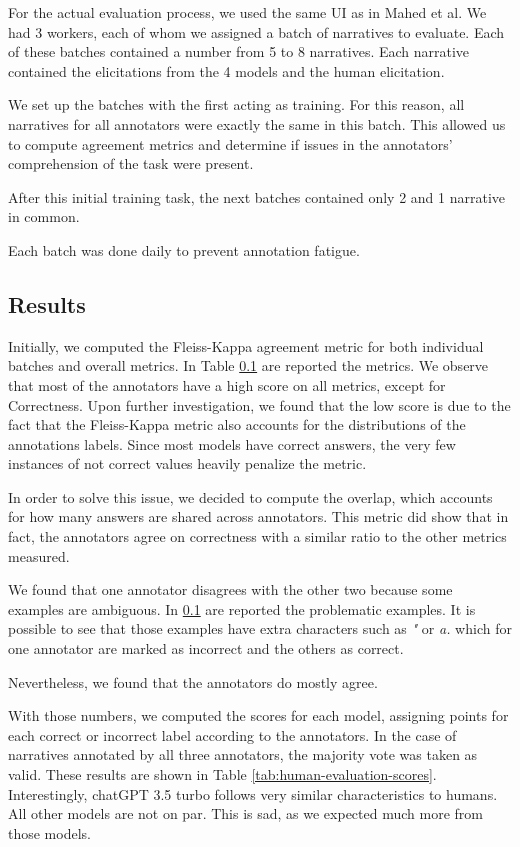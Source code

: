 For the actual evaluation process, we used the same UI as in Mahed et al. 
We had 3 workers, each of whom we assigned a batch of narratives to evaluate. 
Each of these batches contained a number from 5 to 8 narratives. Each narrative contained the elicitations from the 4 models and the human elicitation. 

We set up the batches with the first acting as training. For this reason, all narratives for all annotators were exactly the same in this batch. This allowed us to compute agreement metrics and determine if issues in the annotators' comprehension of the task were present.

After this initial training task, the next batches contained only 2 and 1 narrative in common. 

Each batch was done daily to prevent annotation fatigue.

\subsection{Results}
Initially, we computed the Fleiss-Kappa \cite{fleiss} agreement metric for both individual batches and overall metrics. In Table \ref{} are reported the metrics. We observe that most of the annotators have a high score on all metrics, except for Correctness. Upon further investigation, we found that the low score is due to the fact that the Fleiss-Kappa metric also accounts for the distributions of the annotations labels. Since most models have correct answers, the very few instances of not correct values heavily penalize the metric.

In order to solve this issue, we decided to compute the overlap, which accounts for how many answers are shared across annotators. This metric did show that in fact, the annotators agree on correctness with a similar ratio to the other metrics measured.

We found that one annotator disagrees with the other two because some examples are ambiguous. In \ref{} are reported the problematic examples. It is possible to see that those examples have extra characters such as \emph{"} or \emph{a.} which for one annotator are marked as incorrect and the others as correct.

Nevertheless, we found that the annotators do mostly agree.


With those numbers, we computed the scores for each model, assigning points for each correct or incorrect label according to the annotators. In the case of narratives annotated by all three annotators, the majority vote was taken as valid. These results are shown in Table \ref{tab:human-evaluation-scores}.
Interestingly,  chatGPT 3.5 turbo follows very similar characteristics to humans. All other models are not on par. This is sad, as we expected much more from those models.

